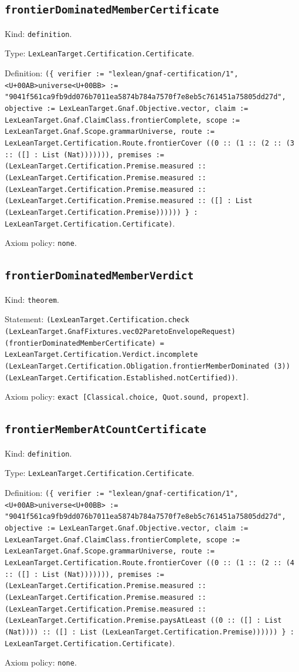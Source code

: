 \documentclass[11pt]{article}
\begin{document}
\subsection*{\texttt{frontierDominatedMemberCertificate}}
\noindent Kind: \texttt{definition}.\par
\noindent Type: \texttt{LexLeanTarget.Certification.Certificate}.\par
\noindent Definition: \texttt{(\{ verifier := "lexlean/gnaf-certification/1", <U+00AB>universe<U+00BB> := "9041f561ca9fb9dd076b7011ea5874b784a7570f7e8eb5c761451a75805dd27d", objective := LexLeanTarget.Gnaf.Objective.vector, claim := LexLeanTarget.Gnaf.ClaimClass.frontierComplete, scope := LexLeanTarget.Gnaf.Scope.grammarUniverse, route := LexLeanTarget.Certification.Route.frontierCover ((0 :: (1 :: (2 :: (3 :: ([] : List (Nat))))))), premises := (LexLeanTarget.Certification.Premise.measured :: (LexLeanTarget.Certification.Premise.measured :: (LexLeanTarget.Certification.Premise.measured :: (LexLeanTarget.Certification.Premise.measured :: ([] : List (LexLeanTarget.Certification.Premise)))))) \} : LexLeanTarget.Certification.Certificate)}.\par
\noindent Axiom policy: \texttt{none}.\par
\subsection*{\texttt{frontierDominatedMemberVerdict}}
\noindent Kind: \texttt{theorem}.\par
\noindent Statement: \texttt{(LexLeanTarget.Certification.check (LexLeanTarget.GnafFixtures.vec02ParetoEnvelopeRequest) (frontierDominatedMemberCertificate) = LexLeanTarget.Certification.Verdict.incomplete (LexLeanTarget.Certification.Obligation.frontierMemberDominated (3)) (LexLeanTarget.Certification.Established.notCertified))}.\par
\noindent Axiom policy: \texttt{exact [Classical.choice, Quot.sound, propext]}.\par
\subsection*{\texttt{frontierMemberAtCountCertificate}}
\noindent Kind: \texttt{definition}.\par
\noindent Type: \texttt{LexLeanTarget.Certification.Certificate}.\par
\noindent Definition: \texttt{(\{ verifier := "lexlean/gnaf-certification/1", <U+00AB>universe<U+00BB> := "9041f561ca9fb9dd076b7011ea5874b784a7570f7e8eb5c761451a75805dd27d", objective := LexLeanTarget.Gnaf.Objective.vector, claim := LexLeanTarget.Gnaf.ClaimClass.frontierComplete, scope := LexLeanTarget.Gnaf.Scope.grammarUniverse, route := LexLeanTarget.Certification.Route.frontierCover ((0 :: (1 :: (2 :: (4 :: ([] : List (Nat))))))), premises := (LexLeanTarget.Certification.Premise.measured :: (LexLeanTarget.Certification.Premise.measured :: (LexLeanTarget.Certification.Premise.measured :: (LexLeanTarget.Certification.Premise.paysAtLeast ((0 :: ([] : List (Nat)))) :: ([] : List (LexLeanTarget.Certification.Premise)))))) \} : LexLeanTarget.Certification.Certificate)}.\par
\noindent Axiom policy: \texttt{none}.\par
\end{document}
